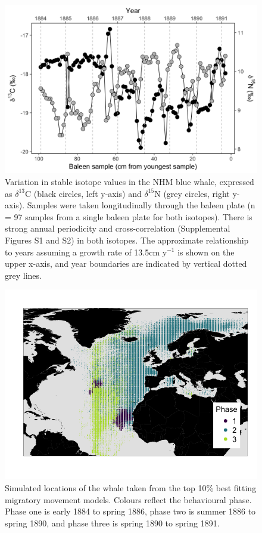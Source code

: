 \documentclass[a4paper,12pt]{article}
\begin{document}
\begin{figure}
  \centering
  \includegraphics[width = \linewidth]{figures/Figure-1-raw-dC-dN-data.png}
  \caption{Variation in stable isotope values in the NHM blue whale, expressed as $\delta^{13}$C (black circles, left y-axis) and $\delta^{15}$N (grey circles, right y-axis). Samples were taken longitudinally through the baleen plate (n = 97 samples from a single baleen plate for both isotopes). There is strong annual periodicity and cross-correlation (Supplemental Figures S1 and S2) in both isotopes. The approximate relationship to years assuming a growth rate of 13.5cm y$^{-1}$ is shown on the upper x-axis, and year boundaries are indicated by vertical dotted grey lines.}
  \label{fig1}
\end{figure}

\begin{figure}
 \centering
 \includegraphics[width = \linewidth]{figures/Figure-2-points.png}
  \caption{Simulated locations of the whale taken from the top 10\% best fitting migratory movement models. 
  Colours reflect the behavioural phase. 
  Phase one is early 1884 to spring 1886, phase two is summer 1886 to spring 1890, and phase three is spring 1890 to spring 1891.}
  \label{fig2}
\end{figure}
\end{document}
